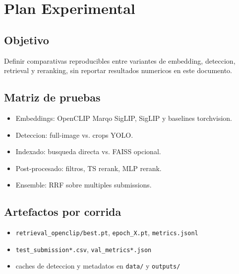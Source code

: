 \section{Plan Experimental}

\subsection{Objetivo}

Definir comparativas reproducibles entre variantes de embedding, deteccion, retrieval y reranking, sin reportar resultados numericos en este documento.

\subsection{Matriz de pruebas}

\begin{itemize}
  \item Embeddings: OpenCLIP Marqo SigLIP, SigLIP y baselines torchvision.
  \item Deteccion: full-image vs. crops YOLO.
  \item Indexado: busqueda directa vs. FAISS opcional.
  \item Post-procesado: filtros, TS rerank, MLP rerank.
  \item Ensemble: RRF sobre multiples submissions.
\end{itemize}

\subsection{Artefactos por corrida}

\begin{itemize}
  \item \texttt{retrieval\_openclip/best.pt}, \texttt{epoch\_X.pt}, \texttt{metrics.jsonl}
  \item \texttt{test\_submission*.csv}, \texttt{val\_metrics*.json}
  \item caches de deteccion y metadatos en \texttt{data/} y \texttt{outputs/}
\end{itemize}
